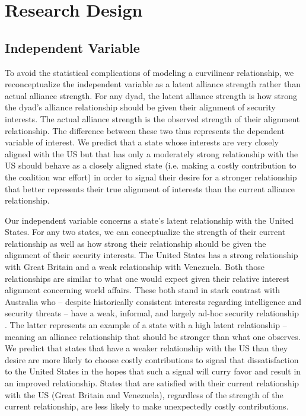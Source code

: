 \documentclass[12pt,letterpaper]{article}
\begin{document}
\section{Research Design}
	\subsection{Independent Variable}
		To avoid the statistical complications of modeling a curvilinear relationship, we reconceptualize the independent variable as a latent alliance strength rather than actual alliance strength. For any dyad, the latent alliance strength is how strong the dyad's alliance relationship should be given their alignment of security interests. The actual alliance strength is the observed strength of their alignment relationship. The difference between these two thus represents the dependent variable of interest. We predict that a state whose interests are very closely aligned with the US but that has only a moderately strong relationship with the US should behave as a closely aligned state (i.e. making a costly contribution to the coalition war effort) in order to signal their desire for a stronger relationship that better represents their true alignment of interests than the current alliance relationship.
	
		Our independent variable concerns a state's latent relationship with the United States. For any two states, we can conceptualize the strength of their current relationship as well as how strong their relationship should be given the alignment of their security interests. The United States has a strong relationship with Great Britain and a weak relationship with Venezuela. Both those relationships are similar to what one would expect given their relative interest alignment concerning world affairs. These both stand in stark contrast with Australia who -- despite historically consistent interests regarding intelligence and security threats -- have a weak, informal, and largely ad-hoc security relationship \citep{fruhling_anzusreallyalliance_2018}. The latter represents an example of a state with a high latent relationship -- meaning an alliance relationship that should be stronger than what one observes. We predict that states that have a weaker relationship with the US than they desire are more likely to choose costly contributions to signal that dissatisfaction to the United States in the hopes that such a signal will curry favor and result in an improved relationship. States that are satisfied with their current relationship with the US (Great Britain and Venezuela), regardless of the strength of the current relationship, are less likely to make unexpectedly costly contributions.
\end{document}
